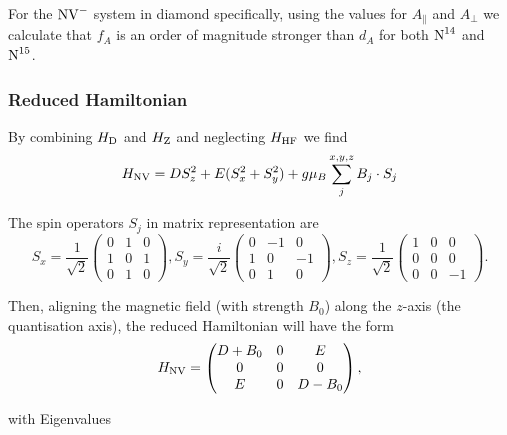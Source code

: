 For the $\ce{NV^-}$ system in diamond specifically, using the values for $A_\parallel$ and $A_\perp$ we calculate that $f_A$ is an order of magnitude stronger than $d_A$ for both $\ce{N^{14}}$ and $\ce{N^{15}}$. 

\subsubsection{Reduced Hamiltonian}
By combining $H_{\ce{D}}$ and $H_{\ce{Z}}$ 
and neglecting $H_{\ce{HF}}$ 
we find 
\begin{equation}
    H_{\ce{NV}} = D S_z^2 + E(S_x^2 + S_y^2) + g \mu_B \sum_{j}^{x,y,z} B_j \cdot S_j 
    \label{eq:reduced_H_NV}
\end{equation}

The spin operators $S_j$ in matrix representation are 
\begin{equation}
    S_x = \frac{1}{\sqrt{2}} \begin{pmatrix}
        0 & 1 & 0 \\ 
        1 & 0 & 1 \\ 
        0 & 1 & 0
    \end{pmatrix}, 
    S_y = \frac{i}{\sqrt{2}} \begin{pmatrix}
        0 & -1 & 0 \\ 
        1 & 0 & -1 \\ 
        0 & 1 & 0
    \end{pmatrix}, 
    S_z = \frac{1}{\sqrt{2}} \begin{pmatrix}
        1 & 0 & 0 \\ 
        0 & 0 & 0 \\ 
        0 & 0 & -1
    \end{pmatrix}. 
    \label{eq:spin_operators}
\end{equation}

Then, aligning the magnetic field (with strength $B_0$) along the $z$-axis (the quantisation axis), the reduced Hamiltonian will have the form 
\begin{equation}
    H_{\ce{NV}} = \begin{pmatrix}
        D + B_0 & 0 & E \\ 
        0 & 0 & 0 \\ 
        E & 0 & D-B_0
    \end{pmatrix},
    \label{eq:reduced_H_NV_matrix}
\end{equation}

with Eigenvalues 

